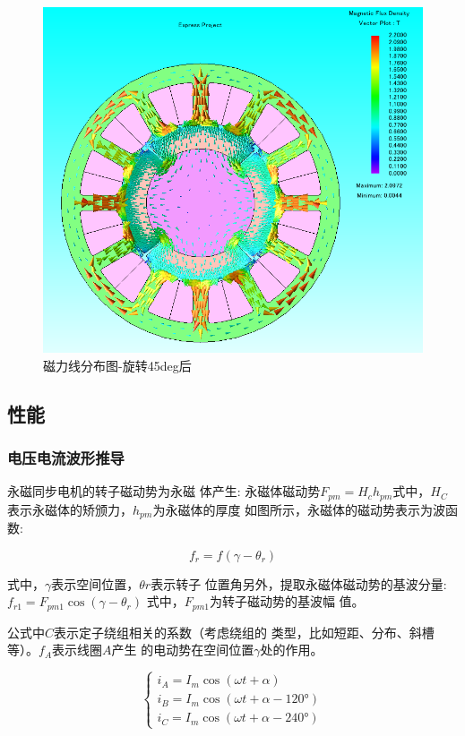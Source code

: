 \documentclass{thuemp}
\begin{document}
\begin{figure}[H]
  \centering
  \includegraphics[width=1\linewidth]{./img/task1/mag-LineImg-turn45deg.png}
  \caption{磁力线分布图-旋转45deg后}
\end{figure}


\subsection{性能}
\subsubsection{电压电流波形推导}
永磁同步电机的转子磁动势为永磁
体产生: 永磁体磁动势$F_{pm}=H_c h_{pm}$式中，$H_C$表示永磁体的矫颁力，$h_{pm}$为永磁体的厚度
如图所示，永磁体的磁动势表示为波函数:

$$f_r=f\left(\gamma-\theta_r\right)$$

式中，$\gamma$表示空间位置，$θr$表示转子
位置角另外，提取永磁体磁动势的基波分量: $f_{r1}=F_{pm1}\cos{(\gamma-\theta_r)}$
式中，$F_{pm1}$为转子磁动势的基波幅
值。

公式中$C$表示定子绕组相关的系数（考虑绕组的
类型，比如短距、分布、斜槽等）。$f_A$表示线圈$A$产生
的电动势在空间位置$\gamma$处的作用。

$$\left.\left\{\begin{array}{l}i_A=I_m\cos(\omega t+\alpha)\\i_B=I_m\cos{(\omega t+\alpha-120°)}\\i_C=I_m\cos{(\omega t+\alpha-240°)}\end{array}\right.\right.$$
\end{document}
